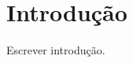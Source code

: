 \documentclass[_ArquivoPrincipal.tex]{subfiles}
\begin{document}
\chapter{Introdução}
Escrever introdução.
\end{document}
